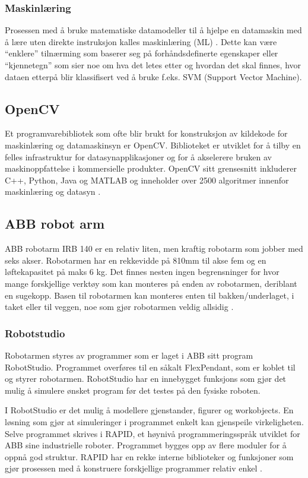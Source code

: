 \documentclass[conference]{IEEEtran}
\begin{document}
        \subsubsection{Maskinlæring}
            Prosessen med å bruke matematiske datamodeller til å hjelpe en datamaskin med å lære uten direkte instruksjon kalles maskinlæring (ML) \cite{teori:ML}. 
            Dette kan være “enklere” tilnærming som baserer seg på forhåndsdefinerte egenskaper eller “kjennetegn” som sier noe om hva det letes etter og hvordan det skal finnes, hvor dataen etterpå blir klassifisert ved å bruke f.eks. SVM (Support Vector Machine).

    \subsection{OpenCV}
    Et programvarebibliotek som ofte blir brukt for konstruksjon av kildekode for maskinlæring og datamaskinsyn er OpenCV.  Biblioteket er utviklet for å tilby en felles infrastruktur for datasynapplikasjoner og for å akselerere bruken av maskinoppfattelse i kommersielle produkter. OpenCV sitt grensesnitt inkluderer C++, Python, Java og MATLAB og inneholder over 2500 algoritmer innenfor maskinlæring og datasyn \cite{teori:OpenCV}. 

    \subsection{ABB robot arm}
        ABB robotarm IRB 140 er en relativ liten, men kraftig robotarm som jobber med seks akser. Robotarmen har en rekkevidde på 810mm til  akse fem og en løftekapasitet på maks 6 kg. Det finnes nesten ingen begrensninger for hvor mange forskjellige verktøy som kan monteres på enden av robotarmen, deriblant en sugekopp. Basen til robotarmen kan monteres enten til bakken/underlaget, i taket eller til veggen, noe som gjør robotarmen veldig allsidig \cite{teori:ABB}. 

    \subsubsection{Robotstudio}
        Robotarmen styres av programmer som er laget i ABB sitt program RobotStudio. Programmet overføres til en såkalt FlexPendant, som er koblet til og styrer robotarmen. RobotStudio har en innebygget funksjons som gjør det mulig å simulere ønsket program før det testes på den fysiske roboten.

        I RobotStudio er det mulig å modellere gjenstander, figurer og workobjects. En løsning som gjør at simuleringer i programmet enkelt kan gjenspeile virkeligheten. Selve programmet skrives i RAPID, et høynivå programmeringsspråk utviklet for ABB sine industrielle roboter. 
        Programmet bygges opp av flere moduler for å oppnå god struktur. RAPID har en rekke interne biblioteker og funksjoner som gjør prosessen med å konstruere forskjellige programmer relativ enkel \cite{teori:RobStud} \cite{teori:RobStud1}. 
\end{document}
